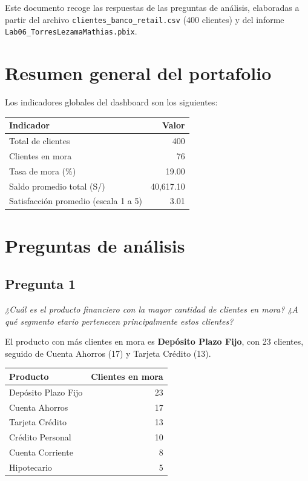 \documentclass[11pt,a4paper]{article}
\newcommand{\pregunta}[2]{\subsection*{Pregunta #1}\textit{#2}}
\begin{document}
Este documento recoge las respuestas de las preguntas de análisis, elaboradas a partir del archivo \texttt{clientes\_banco\_retail.csv} (400 clientes) y del informe \texttt{Lab06\_TorresLezamaMathias.pbix}.

\section*{Resumen general del portafolio}

Los indicadores globales del dashboard son los siguientes:

\begin{center}
\begin{tabular}{@{}lr@{}}
\toprule
Indicador & Valor \\
\midrule
Total de clientes & 400 \\
Clientes en mora & 76 \\
Tasa de mora (\%) & 19.00 \\
Saldo promedio total (S/) & 40,617.10 \\
Satisfacción promedio (escala 1 a 5) & 3.01 \\
\bottomrule
\end{tabular}
\end{center}

\section*{Preguntas de análisis}

\pregunta{1}{¿Cuál es el producto financiero con la mayor cantidad de clientes en mora? ¿A qué segmento etario pertenecen principalmente estos clientes?}

El producto con más clientes en mora es \textbf{Depósito Plazo Fijo}, con 23 clientes, seguido de Cuenta Ahorros (17) y Tarjeta Crédito (13).

\begin{center}
\begin{tabular}{@{}lr@{}}
\toprule
Producto & Clientes en mora \\
\midrule
Depósito Plazo Fijo & 23 \\
Cuenta Ahorros & 17 \\
Tarjeta Crédito & 13 \\
Crédito Personal & 10 \\
Cuenta Corriente & 8 \\
Hipotecario & 5 \\
\bottomrule
\end{tabular}
\end{center}
\end{document}
